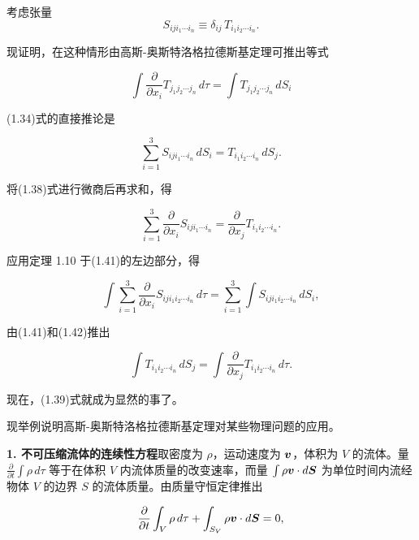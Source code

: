 考虑张量
\begin{equation}
S_{iji_1 \cdots i_n} \equiv \delta_{ij}\, T_{i_1 i_2 \cdots i_n}.
\tag{1.38}
\end{equation}

现证明，在这种情形由高斯-奥斯特洛格拉德斯基定理可推出等式

\begin{equation}
\int \frac{\partial}{\partial x_i} T_{j_1 j_2 \cdots j_n}\, d\tau = \int T_{j_1 j_2 \cdots j_n}\, dS_i
\tag{1.39}
\end{equation}

(1.34)式的直接推论是

\begin{equation}
\sum_{i=1}^{3} S_{iji_1 \cdots i_n}\, dS_i = T_{i_1 i_2 \cdots i_n}\, dS_j.
\tag{1.40}
\end{equation}

将(1.38)式进行微商后再求和，得

\begin{equation}
\sum_{i=1}^{3} \frac{\partial}{\partial x_i} S_{iji_1 \cdots i_n} = \frac{\partial}{\partial x_j} T_{i_1 i_2 \cdots i_n}.
\tag{1.41}
\end{equation}

应用定理 1.10 于(1.41)的左边部分，得

\begin{equation}
\int \sum_{i=1}^{3} \frac{\partial}{\partial x_i} S_{iji_1 i_2 \cdots i_n}\, d\tau = \sum_{i=1}^{3} \int S_{iji_1 i_2 \cdots i_n}\, dS_i,
\tag{1.42}
\end{equation}

由(1.41)和(1.42)推出

\begin{equation*}
\int T_{i_1 i_2 \cdots i_n}\, dS_j = \int \frac{\partial}{\partial x_j} T_{i_1 i_2 \cdots i_n}\, d\tau.
\end{equation*}

现在，(1.39)式就成为显然的事了。

现举例说明高斯-奥斯特洛格拉德斯基定理对某些物理问题的应用。

\textbf{1. 不可压缩流体的连续性方程}\quad 取密度为 $\rho$，运动速度为 $\bm{v}$，体积为 $V$ 的流体。量 $\frac{\partial}{\partial t} \int \rho\, d\tau$ 等于在体积 $V$ 内流体质量的改变速率，而量 $\int \rho\bm{v} \cdot d\bm{S}$ 为单位时间内流经物体 $V$ 的边界 $S$ 的流体质量。由质量守恒定律推出

\begin{equation*}
\frac{\partial}{\partial t} \int_{V} \rho\, d\tau + \int_{S_V} \rho\bm{v} \cdot d\bm{S} = 0,
\end{equation*}

